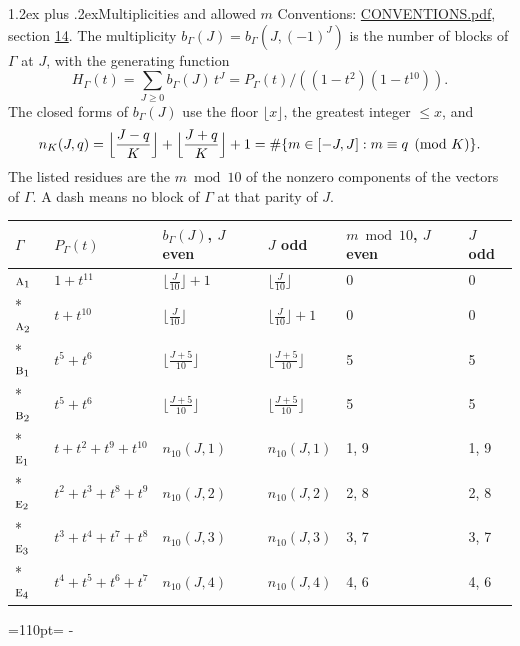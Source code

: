 \documentclass[10pt,a4paper]{article}
\makeatletter
\renewcommand\section{\@startsection{section}{1}{\z@}{-3ex plus -1ex minus -.2ex}%
  {1.2ex plus .2ex}{\normalfont\large\sffamily\bfseries\color{parttitle}}}
\newcommand{\needspace}[1]{\par\penalty-100\begingroup\dimen0=#1\relax\dimen2=\pagegoal
  \advance\dimen2-\pagetotal\ifdim\dimen0>\dimen2\relax\ifdim\dimen2>0pt\vfil\break\fi\fi
  \endgroup}
\numberwithin{equation}{section}
\newcommand{\irr}[1]{\text{\normalfont\scshape #1}}
\makeatother
\begin{document}
\section{Multiplicities and allowed \texorpdfstring{$m$}{m}}\label{s:multiplicities}
Conventions: \href{../../CONVENTIONS.pdf}{CONVENTIONS.pdf}, section \href{../../CONVENTIONS.pdf\#conv.14}{14}.
\leavevmode\label{n:function.generating}\label{n:index.generating.variable}\label{n:function.generating.numerator}The multiplicity $b_\Gamma(J) = b_\Gamma(J, (-1)^J)$ is the number of blocks of $\Gamma$ at $J$, with the generating function
\begin{equation}\label{e:gf}H_\Gamma(t) = \sum_{J\ge0} b_\Gamma(J)\,t^J = P_\Gamma(t)/((1-t^{2})(1-t^{10})).\end{equation}
\leavevmode\label{n:delimiter.floor}\label{n:local.floor.x}\label{n:function.count}\label{n:index.modulus.K}\label{n:index.residue}The closed forms of $b_\Gamma(J)$ use the floor $\lfloor x\rfloor$, the greatest integer $\le x$, and
\begin{equation}\label{e:count}n_K(J,q) = \Bigl\lfloor\frac{J-q}{K}\Bigr\rfloor + \Bigl\lfloor\frac{J+q}{K}\Bigr\rfloor + 1 = \#\{m\in[-J,J] : m\equiv q \pmod{K}\}.\end{equation}
\leavevmode\label{n:head.parity}The listed residues are the $m \bmod 10$ of the nonzero components of the vectors of $\Gamma$. A dash means no block of $\Gamma$ at that parity of $J$.
{\small{\renewcommand{\arraystretch}{1.3}\begin{longtable}{@{}llllll@{}}\toprule
$\Gamma$ & $P_\Gamma(t)$ & $b_\Gamma(J)$, $J$ even & $J$ odd & $m \bmod 10$, $J$ even & $J$ odd\\\midrule\endhead
\bottomrule\endfoot\endlastfoot
$\irr{a}_{1}$ & $1 + t^{11}$ & $\bigl\lfloor\tfrac{J}{10}\bigr\rfloor + 1$ & $\bigl\lfloor\tfrac{J}{10}\bigr\rfloor$ & 0 & 0\\*
$\irr{a}_{2}$ & $t + t^{10}$ & $\bigl\lfloor\tfrac{J}{10}\bigr\rfloor$ & $\bigl\lfloor\tfrac{J}{10}\bigr\rfloor + 1$ & 0 & 0\\*
$\irr{b}_{1}$ & $t^{5} + t^{6}$ & $\bigl\lfloor\tfrac{J+5}{10}\bigr\rfloor$ & $\bigl\lfloor\tfrac{J+5}{10}\bigr\rfloor$ & 5 & 5\\*
$\irr{b}_{2}$ & $t^{5} + t^{6}$ & $\bigl\lfloor\tfrac{J+5}{10}\bigr\rfloor$ & $\bigl\lfloor\tfrac{J+5}{10}\bigr\rfloor$ & 5 & 5\\*
$\irr{e}_{1}$ & $t + t^{2} + t^{9} + t^{10}$ & $n_{10}(J,1)$ & $n_{10}(J,1)$ & 1, 9 & 1, 9\\*
$\irr{e}_{2}$ & $t^{2} + t^{3} + t^{8} + t^{9}$ & $n_{10}(J,2)$ & $n_{10}(J,2)$ & 2, 8 & 2, 8\\*
$\irr{e}_{3}$ & $t^{3} + t^{4} + t^{7} + t^{8}$ & $n_{10}(J,3)$ & $n_{10}(J,3)$ & 3, 7 & 3, 7\\*
$\irr{e}_{4}$ & $t^{4} + t^{5} + t^{6} + t^{7}$ & $n_{10}(J,4)$ & $n_{10}(J,4)$ & 4, 6 & 4, 6\\
\bottomrule\end{longtable}}}
\needspace{110pt}
\end{document}
